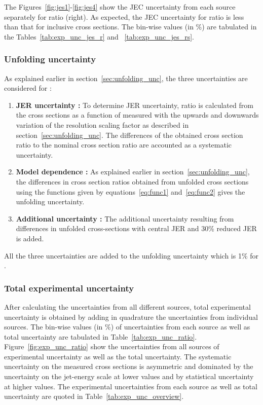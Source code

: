 The Figures~\ref{fig:jes1}-\ref{fig:jes4} show the JEC uncertainty from each source separately for ratio \ratio (right). As expected, the JEC uncertainty for ratio is less than that for inclusive cross sections. The bin-wise values (in \%) are tabulated in the Tables~\ref{tab:exp_unc_jes_r} and ~\ref{tab:exp_unc_jes_rs}.

\subsubsection{Unfolding uncertainty}
\label{sec:unfolding_unc_ratio}
As explained earlier in section~\ref{sec:unfolding_unc}, the three uncertainties are considered for \ratio :

\begin{enumerate}
\item {\bf JER uncertainty :} To determine JER uncertainty, ratio \ratio is calculated from the cross sections as a function of \httwo measured with the upwards and downwards variation of the resolution scaling factor as described in section~\ref{sec:unfolding_unc}. The differences of the obtained cross section ratio to the nominal cross section ratio are accounted as a systematic uncertainty. 

\item {\bf Model dependence : } As explained earlier in section~\ref{sec:unfolding_unc}, the differences in cross section ratios obtained from unfolded cross sections using the functions given by equations~\ref{eq:func1} and~\ref{eq:func2} gives the unfolding uncertainty. 

\item {\bf Additional uncertainty : } The additional uncertainty resulting from differences in unfolded cross-sections with central JER and 30\% reduced JER is added.

\end{enumerate}

All the three uncertainties are added to the unfolding uncertainty which is 1\% for \ratio.

\subsubsection{Total experimental uncertainty}
After calculating the uncertainties from all different sources, total experimental uncertainty is obtained by adding in quadrature the 
uncertainties from individual sources. The bin-wise values (in \%) of uncertainties from each source as well as total uncertainty are tabulated in Table~\ref{tab:exp_unc_ratio}. Figure~\ref{fig:exp_unc_ratio} show the uncertainties from all sources of 
experimental uncertainty as well as the total uncertainty. The systematic uncertainty on the measured cross 
sections is asymmetric and dominated by the uncertainty on the jet-energy scale at lower \httwo values and by statistical uncertainty at 
higher \httwo values. The experimental uncertainties from each source as well as total uncertainty are quoted in Table~\ref{tab:exp_unc_overview}.

